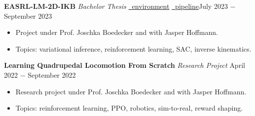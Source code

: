 \documentclass{article}
\begin{document}
\noindent \textbf{EASRL-LM-2D-IKB} \textit{Bachelor Thesis} \href{https://github.com/RobinU434/IK-RL}{\faGithubSquare \ environment} \href{https://github.com/RobinU434/SPARK/tree/v0.0.1-bachelor-thesis-submission}{\faGithubSquare \ pipeline}\hfill July 2023 $-$ September 2023
\begin{itemize}[noitemsep,nolistsep,leftmargin=*]
    \item Project under Prof. Joschka Boedecker and with Jasper Hoffmann.
    \item Topics: variational inference, reinforcement learning, SAC, inverse kinematics.\\
\end{itemize} 

\noindent \textbf{Learning Quadrupedal Locomotion From Scratch} \textit{Research Project} \href{https://github.com/feinran/locomotion_simulation}{\faGithubSquare}\hfill  April 2022 $-$ September 2022
\begin{itemize}[noitemsep,nolistsep,leftmargin=*]
    \item Research project under Prof. Joschka Boedecker and with Jasper Hoffmann.
    \item Topics: reinforcement learning, PPO, robotics, sim-to-real, reward shaping.\\
\end{itemize}
\end{document}
